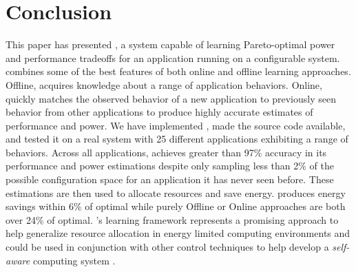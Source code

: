 \section{Conclusion}
\label{sec:conclusion}
This paper has presented \SYSTEMLEO{}, a system capable of learning
Pareto-optimal power and performance tradeoffs for an application
running on a configurable system.  \SYSTEMLEO{} combines some of the best
features of both online and offline learning approaches.  Offline,
\SYSTEMLEO{} acquires knowledge about a range of application behaviors.
Online, \SYSTEMLEO{} quickly matches the observed behavior of a new
application to previously seen behavior from other applications to
produce highly accurate estimates of performance and power.  We have
implemented \SYSTEMLEO{}, made the source code available, and tested it
on a real system with 25 different applications exhibiting a range of
behaviors.  Across all applications, \SYSTEMLEO{} achieves greater than
97\% accuracy in its performance and power estimations despite only
sampling less than 2\% of the possible configuration space for an
application it has never seen before.  These estimations are then used
to allocate resources and save energy.  \SYSTEMLEO{} produces energy
savings within 6\% of optimal while purely Offline or Online
approaches are both over 24\% of optimal.  \SYSTEMLEO{}'s learning
framework represents a promising approach to help generalize resource
allocation in energy limited computing environments and could be used
in conjunction with other control techniques to help develop a
\emph{self-aware} computing system
\cite{Hoffmann2012,1508273,1333571,1516538,Kephardt2005,laddaga1999}.
